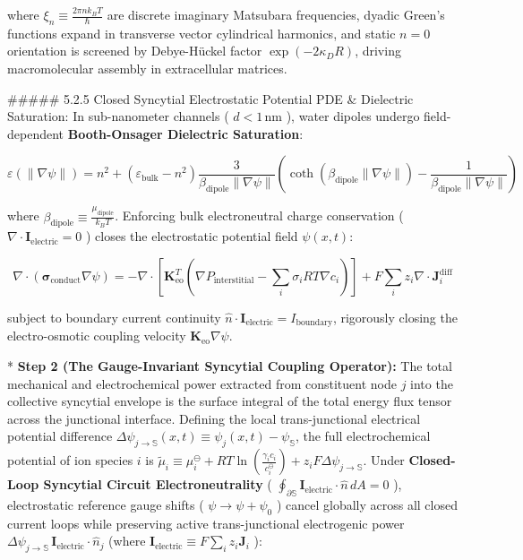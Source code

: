 \documentclass[11pt,a4paper]{article}
\theoremstyle{definition}
\theoremstyle{remark}
\begin{document}
where $\xi_n \equiv \frac{2\pi n k_B T}{\hbar}$ are discrete imaginary Matsubara frequencies, dyadic Green's functions expand in transverse vector cylindrical harmonics, and static $n=0$ orientation is screened by Debye-Hückel factor $\exp(-2\kappa_D R)$, driving macromolecular assembly in extracellular matrices.

\#\#\#\#\# 5.2.5 Closed Syncytial Electrostatic Potential PDE \& Dielectric Saturation:
In sub-nanometer channels ( $d < 1 \, \mathrm{nm}$ ), water dipoles undergo field-dependent \textbf{Booth-Onsager Dielectric Saturation}:


\begin{equation}
\varepsilon(\|\nabla\psi\|) = n^2 + (\varepsilon_{\text{bulk}} - n^2) \frac{3}{\beta_{\text{dipole}} \|\nabla\psi\|} \left( \coth(\beta_{\text{dipole}} \|\nabla\psi\|) - \frac{1}{\beta_{\text{dipole}} \|\nabla\psi\|} \right)
\end{equation}


where $\beta_{\text{dipole}} \equiv \frac{\mu_{\text{dipole}}}{k_B T}$. Enforcing bulk electroneutral charge conservation ( $\nabla \cdot \mathbf{I}_{\text{electric}} = 0$ ) closes the electrostatic potential field $\psi(x, t)$:


\begin{equation}
\boxed{\nabla \cdot \left( \boldsymbol{\sigma}_{\text{conduct}} \nabla \psi \right) = -\nabla \cdot [ \mathbf{K}_{\text{eo}}^T \left( \nabla P_{\text{interstitial}} - \sum_i \sigma_i R T \nabla c_i \right) ] + F \sum_i z_i \nabla \cdot \mathbf{J}_i^{\text{diff}}}
\end{equation}


subject to boundary current continuity $\hat{n} \cdot \mathbf{I}_{\text{electric}} = I_{\text{boundary}}$, rigorously closing the electro-osmotic coupling velocity $\mathbf{K}_{\text{eo}}\nabla \psi$.

* \textbf{Step 2 (The Gauge-Invariant Syncytial Coupling Operator):}
The total mechanical and electrochemical power extracted from constituent node $j$ into the collective syncytial envelope is the surface integral of the total energy flux tensor across the junctional interface. Defining the local trans-junctional electrical potential difference $\Delta \psi_{j \to \mathbb{S}}(x, t) \equiv \psi_j(x, t) - \psi_{\mathbb{S}}$, the full electrochemical potential of ion species $i$ is $\tilde{\mu}_i \equiv \mu_i^\ominus + R T \ln \left( \frac{\gamma_i c_i}{c_i^\ominus} \right) + z_i F \Delta \psi_{j \to \mathbb{S}}$. Under \textbf{Closed-Loop Syncytial Circuit Electroneutrality} ( $\oint_{\partial \mathbb{S}} \mathbf{I}_{\text{electric}} \cdot \hat{n} \, dA = 0$ ), electrostatic reference gauge shifts ( $\psi \to \psi + \psi_0$ ) cancel globally across all closed current loops while preserving active trans-junctional electrogenic power $\Delta \psi_{j \to \mathbb{S}} \, \mathbf{I}_{\text{electric}} \cdot \hat{n}_j$ (where $\mathbf{I}_{\text{electric}} \equiv F \sum_i z_i \mathbf{J}_i$ ):
\end{document}
